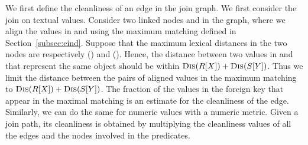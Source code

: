 We first define the cleanliness of an edge in the join graph. We first consider the join on textual values. Consider two linked nodes \RX and \SY in the graph, where we align the values in \RX and \SY using the maximum matching defined in Section~\ref{subsec:eind}. Suppose that the maximum lexical distances in the two nodes are respectively \Dis(\RX) and \Dis(\SY). Hence, the distance between two values in \RX and \SY that represent the same object should be within $\textsc{Dis}(R[X])+\textsc{Dis}(S[Y])$. Thus we limit the distance between the pairs of aligned values in the maximum matching to $\textsc{Dis}(R[X])+\textsc{Dis}(S[Y])$. The fraction of the values in the foreign key that appear in the maximal matching is an estimate for the cleanliness of the edge. Similarly, we can do the same  for numeric values with a numeric metric.
Given a join path, its cleanliness is obtained by multiplying the cleanliness values of all the edges and the nodes involved in the predicates.
\fi





